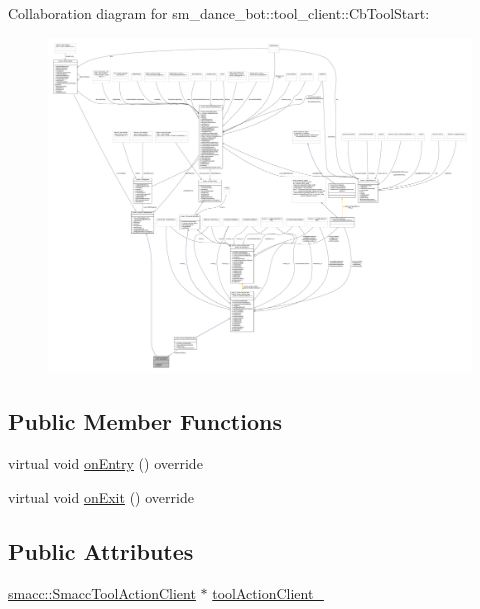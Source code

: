 Collaboration diagram for sm\+\_\+dance\+\_\+bot\+:\+:tool\+\_\+client\+:\+:Cb\+Tool\+Start\+:
\nopagebreak
\begin{figure}[H]
\begin{center}
\leavevmode
\includegraphics[width=350pt]{classsm__dance__bot_1_1tool__client_1_1CbToolStart__coll__graph}
\end{center}
\end{figure}
\subsection*{Public Member Functions}
\begin{DoxyCompactItemize}
\item 
virtual void \hyperlink{classsm__dance__bot_1_1tool__client_1_1CbToolStart_aecce17a02ff17a047a62f96634b9bbd4}{on\+Entry} () override
\item 
virtual void \hyperlink{classsm__dance__bot_1_1tool__client_1_1CbToolStart_aa835b2eef4c23cd83d24880fc47ca0d1}{on\+Exit} () override
\end{DoxyCompactItemize}
\subsection*{Public Attributes}
\begin{DoxyCompactItemize}
\item 
\hyperlink{classsmacc_1_1SmaccToolActionClient}{smacc\+::\+Smacc\+Tool\+Action\+Client} $\ast$ \hyperlink{classsm__dance__bot_1_1tool__client_1_1CbToolStart_af25839ca32b7478b30f3c42356a417bf}{tool\+Action\+Client\+\_\+}
\end{DoxyCompactItemize}


